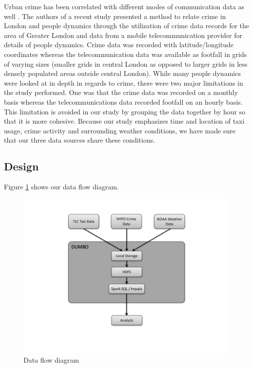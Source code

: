 \documentclass{sigkddExp}
\begin{document}
Urban crime has been correlated with different modes of communication data as well \cite{Traunmueller14}. The authors of a recent study presented a method to relate crime in London and people dynamics through the utilization of crime data records for the area of Greater London and data from a mobile telecommunication provider for details of people dynamics. Crime data was recorded with latitude/longitude coordinates whereas the telecommunication data was available as footfall in grids of varying sizes (smaller grids in central London as opposed to larger grids in less densely populated areas outside central London). While many people dynamics were looked at in depth in regards to crime, there were two major limitations in the study performed. One was that the crime data was recorded on a monthly basis whereas the telecommunications data recorded footfall on an hourly basis. This limitation is avoided in our study by grouping the data together by hour so that it is more cohesive. Because our study emphasizes time and location of taxi usage, crime activity and surrounding weather conditions, we have made sure that our three data sources share these conditions.


\subsection{Design}
Figure \ref{figx} shows our data flow diagram.

\begin{figure}
\caption{Data flow diagram}
\label{figx}
\includegraphics[width=.5\textwidth]{DesignFlowDiagram.pdf}
\end{figure}



\end{document}
